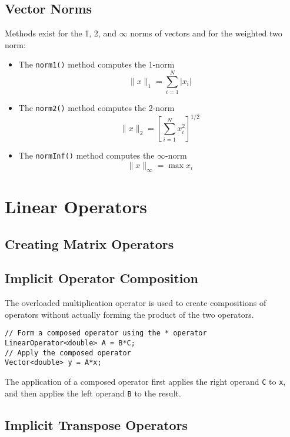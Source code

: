 \documentclass[12pt,relax]{SANDreport}
\begin{document}
\subsection{Vector Norms}

Methods exist for the 1, 2, and $\infty$ norms of vectors and for the
weighted two norm:
\begin{itemize}
\item The \verb+norm1()+ method computes the 1-norm
\begin{equation}
\| x \|_1 = \sum_{i=1}^N \vert x_i \vert
\end{equation}
\item The \verb+norm2()+ method computes the 2-norm
\begin{equation}
\| x \|_2 = \left[\sum_{i=1}^N x_i^2\right]^{1/2}
\end{equation}
\item The \verb+normInf()+ method computes the $\infty$-norm
\begin{equation}
\| x \|_\infty = \max x_i
\end{equation}
\end{itemize}


\section{Linear Operators}

\subsection{Creating Matrix Operators}

\subsection{Implicit Operator Composition}

The overloaded multiplication operator is used to create compositions of
operators without actually forming the product of the two operators. 
\begin{verbatim}
// Form a composed operator using the * operator
LinearOperator<double> A = B*C;
// Apply the composed operator
Vector<double> y = A*x;
\end{verbatim}
The application of a composed operator first applies the right operand
\verb+C+ to \verb+x+, and then applies the left operand \verb+B+
to the result.  


\subsection{Implicit Transpose Operators}
\end{document}
